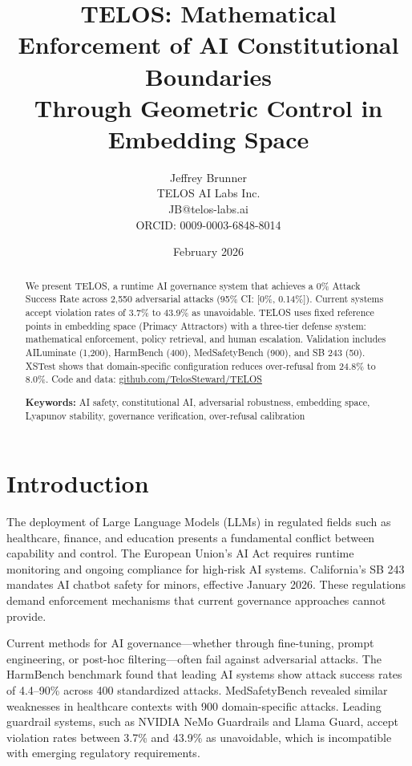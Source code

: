 \documentclass[11pt,twocolumn]{article}
\title{TELOS: Mathematical Enforcement of AI Constitutional Boundaries\\Through Geometric Control in Embedding Space}
\author{Jeffrey Brunner\\TELOS AI Labs Inc.\\JB@telos-labs.ai\\ORCID: 0009-0003-6848-8014}
\date{February 2026}
\begin{document}
\maketitle

\begin{abstract}
We present TELOS, a runtime AI governance system that achieves a 0\% Attack Success Rate across 2,550 adversarial attacks (95\% CI: [0\%, 0.14\%]). Current systems accept violation rates of 3.7\% to 43.9\% as unavoidable. TELOS uses fixed reference points in embedding space (Primacy Attractors) with a three-tier defense system: mathematical enforcement, policy retrieval, and human escalation. Validation includes AILuminate (1,200), HarmBench (400), MedSafetyBench (900), and SB 243 (50). XSTest shows that domain-specific configuration reduces over-refusal from 24.8\% to 8.0\%. Code and data: \url{github.com/TelosSteward/TELOS}

\textbf{Keywords:} AI safety, constitutional AI, adversarial robustness, embedding space, Lyapunov stability, governance verification, over-refusal calibration
\end{abstract}

\section{Introduction}

The deployment of Large Language Models (LLMs) in regulated fields such as healthcare, finance, and education presents a fundamental conflict between capability and control. The European Union's AI Act requires runtime monitoring and ongoing compliance for high-risk AI systems. California's SB 243 mandates AI chatbot safety for minors, effective January 2026. These regulations demand enforcement mechanisms that current governance approaches cannot provide.

Current methods for AI governance---whether through fine-tuning, prompt engineering, or post-hoc filtering---often fail against adversarial attacks. The HarmBench benchmark found that leading AI systems show attack success rates of 4.4--90\% across 400 standardized attacks. MedSafetyBench revealed similar weaknesses in healthcare contexts with 900 domain-specific attacks. Leading guardrail systems, such as NVIDIA NeMo Guardrails and Llama Guard, accept violation rates between 3.7\% and 43.9\% as unavoidable, which is incompatible with emerging regulatory requirements.
\end{document}
